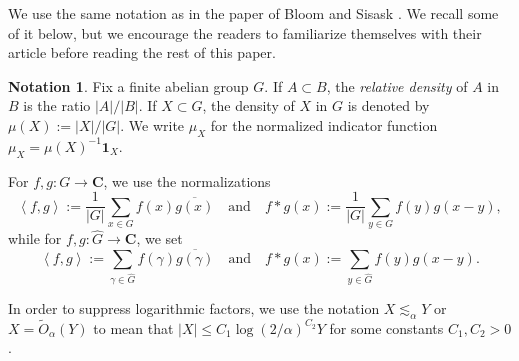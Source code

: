 \documentclass{daj}
\theoremstyle{definition}
\newtheorem{notation}[theorem]{Notation}
\newcommand{\C}{\ensuremath{\mathbf{C}}}
\newcommand{\m}[1]{\mu_{#1}}
\newcommand{\ind}[1]{\mathbf{1}_{#1}}
\newcommand{\inner}[2]{\left\langle#1, #2\right\rangle}
\newcommand{\leqs}[1]{\lesssim_{#1}}
\begin{document}
We use the same notation as in the paper of Bloom and Sisask \cite{BS}. We recall some of it below, but we encourage the readers to familiarize themselves with their article before reading the rest of this paper.

\begin{notation}
Fix a finite abelian group $G$. If $A\subset B$, the \emph{relative density} of $A$ in $B$ is the ratio $|A|/|B|$. If $X\subset G$, the density of $X$ in $G$ is denoted by $\mu(X) := |X|/|G|$. We write $\m{X}$ for the normalized indicator function $\m{X} = \mu(X)^{-1}\ind{X}$. 

For $f, g:G\to \C$, we use the normalizations 
\begin{equation*}
\inner{f}{g} := \frac{1}{|G|} \sum_{x\in G} f(x) \overline{g(x)} \quad \text{and}\quad f * g (x) := \frac{1}{|G|} \sum_{y\in G} f(y) {g(x-y)},
\end{equation*}
while for $f, g:\widehat{G}\to \C$, we set
\begin{equation*}
\inner{f}{g} := \sum_{\gamma\in \widehat{G}} f(\gamma) \overline{g(\gamma)}\quad\text{and}\quad f * g (x) :=\sum_{y\in \widehat{G}} f(y) {g(x-y)}.
\end{equation*}

In order to suppress logarithmic factors, we use the notation $X \leqs{\alpha} Y$ or $X = \tilde{O}_{\alpha}(Y)$ to mean that $|X| \leq C_1 \log(2/\alpha)^{C_2}Y$ for some constants $C_1, C_2 > 0$. 
\end{notation}
\end{document}
